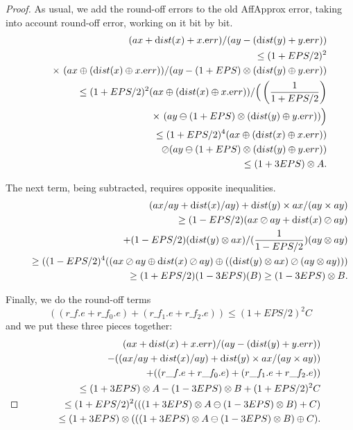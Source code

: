 \begin{proof}{}
As usual, we add the round-off errors to the old AffApprox error, 
taking into account round-off error, working on it bit by bit.
\begin{eqnarray*}
 &&\hskip-16pt (ax + {\textrm dist}(x) + x.{\textrm err})/(ay - ({\textrm dist}(y) + y.{\textrm err}))\\
&&  \le (1 + EPS/2)^2 \\
&&\quad \times \ (ax \oplus ({\textrm dist}(x)
\oplus x.{\textrm err}))/
         (ay - (1 + EPS) \otimes ({\textrm dist}(y) \oplus y.{\textrm err}))\\
&&  \le (1 + EPS/2)^2 (ax \oplus ({\textrm dist}(x) \oplus
x.{\textrm err}))/
         \Big(\left({1 \over 1 + EPS/2}\right) \\
&&\quad\times \ (ay \ominus (1 + EPS) \otimes ({\textrm dist}(y) \oplus y.{\textrm err}))\Big)\\
&& \le (1 + EPS/2)^4 (ax
\oplus ({\textrm dist}(x) \oplus x.{\textrm err}))\\
&&\quad \oslash
         (ay \ominus (1 + EPS) \otimes ({\textrm dist}(y) \oplus y.{\textrm err}))\\
&& \le   (1 + 3EPS) \otimes A.
\end{eqnarray*}

The next term, being subtracted, requires opposite inequalities.
\begin{eqnarray*}
&&(ax/ay + {\textrm dist}(x)/ay) + {\textrm dist}(y) \times ax / (ay \times ay)\\
&&\quad \ge (1-EPS/2)(ax \oslash ay + {\mathrm
dist}(x)
\oslash ay) \\
&&\qquad +  (1-EPS/2) ({\textrm dist}(y) \otimes ax )/ ({1 \over 1 - EPS/2})(ay \otimes ay)\\
&&\quad \ge ((1-EPS/2)^4 ((ax
\oslash ay \oplus {\textrm dist}(x) \oslash ay) \oplus  (({\textrm dist}(y) \otimes ax) \oslash (ay \otimes ay)))\\
&&\quad \ge (1 +
EPS/2)(1 - 3EPS) (B)  \ge (1 - 3EPS) \otimes B.\end{eqnarray*}

Finally, we do the round-off terms 
$$((r\_f.e + r\_f_0.e) + (r\_f_1.e + r\_f_2.e)) \le (1 + EPS/2)^2 C $$
and we put these three pieces together:
\begin{eqnarray*}
&&
(ax + {\textrm dist}(x) + x.{\textrm err})/(ay - ({\textrm dist}(y) + y.{\textrm err}))
\\
&&\qquad  - 
((ax/ay + {\textrm dist}(x)/ay) + {\textrm dist}(y) \times ax / (ay \times ay))\\
&&\qquad
+ ((r\_f.e + r\_f_0.e) + (r\_f_1.e + r\_f_2.e))
\\
&&\quad \le 
(1 + 3EPS) \otimes A - (1 - 3EPS) \otimes B + (1 + EPS/2)^2 C\\
&&\quad \le (1+EPS/2)^2 (
((1 + 3EPS) \otimes A \ominus (1 - 3EPS) \otimes B)
 + C
) \\
&&\quad \le (1+3EPS) \otimes (
((1 + 3EPS) \otimes A \ominus (1 - 3EPS) \otimes B)
 \oplus C
) . \\
\noalign{\vskip-36pt}
\end{eqnarray*}
\end{proof}


